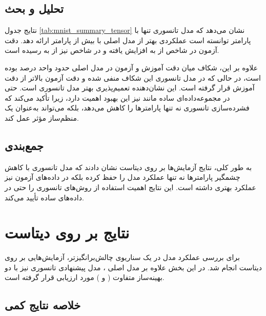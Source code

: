 \subsection{تحلیل و بحث}

نتایج جدول \ref{tab:mnist_summary_tensor} نشان می‌دهد که مدل تانسوری تنها با  پارامتر توانسته است عملکردی بهتر از مدل اصلی با بیش از  پارامتر ارائه دهد. دقت آزمون در شاخص  از  به  افزایش یافته و در شاخص  نیز از  به  رسیده است.  

علاوه بر این، شکاف میان دقت آموزش و آزمون در مدل اصلی حدود  واحد درصد بوده است، در حالی که در مدل تانسوری این شکاف منفی شده و دقت آزمون بالاتر از دقت آموزش قرار گرفته است. این نشان‌دهنده تعمیم‌پذیری بهتر مدل تانسوری است. حتی در مجموعه‌داده‌ای ساده مانند  نیز این بهبود اهمیت دارد، زیرا تأکید می‌کند که فشرده‌سازی تانسوری نه تنها پارامترها را کاهش می‌دهد، بلکه می‌تواند به‌عنوان یک منظم‌ساز مؤثر عمل کند.

\subsection{جمع‌بندی}

به طور کلی، نتایج آزمایش‌ها بر روی دیتاست  نشان دادند که مدل تانسوری با کاهش چشمگیر پارامترها نه تنها عملکرد مدل را حفظ کرده بلکه در داده‌های آزمون نیز عملکرد بهتری داشته است. این نتایج اهمیت استفاده از روش‌های تانسوری را حتی در داده‌های ساده تأیید می‌کند.

\section{نتایج بر روی دیتاست }

برای بررسی عملکرد مدل در یک سناریوی چالش‌برانگیزتر، آزمایش‌هایی بر روی دیتاست  انجام شد. در این بخش علاوه بر مدل اصلی ، مدل پیشنهادی تانسوری نیز با دو بهینه‌ساز متفاوت ( و ) مورد ارزیابی قرار گرفته است.

\subsection{خلاصه نتایج کمی}

